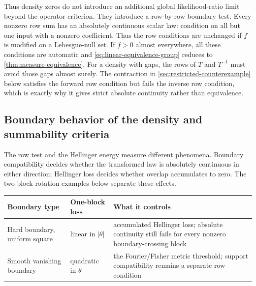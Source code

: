 Thus density zeros do not introduce an additional global likelihood-ratio
limit beyond the operator criterion.
They introduce a row-by-row boundary test.
Every nonzero row sum has an absolutely continuous scalar law: condition
on all but one input with a nonzero coefficient.  Thus the row conditions
are unchanged if $f$ is modified on a Lebesgue-null set.
If $f>0$ almost everywhere, all these conditions are automatic and
\eqref{eq:linear-equivalence-group} reduces to
\cref{thm:measure-equivalence}.
For a density with gaps, the rows of $T$ and $T^{-1}$ must avoid those
gaps almost surely.  The contraction in
\cref{sec:restricted-counterexample} below satisfies the forward row
condition but fails the inverse row condition, which is exactly why it gives
strict absolute continuity rather than equivalence.

\subsection{Boundary behavior of the density and summability criteria}
\label{sec:restricted-threshold}

The row test and the Hellinger energy measure different phenomena.
Boundary compatibility decides whether the transformed law is absolutely
continuous in either direction; Hellinger loss decides whether overlap
accumulates to zero.
The two block-rotation examples below separate these effects.

\begin{center}
\renewcommand{\arraystretch}{1.15}
\begin{tabular}{p{} p{} p{}}
\toprule
\textbf{Boundary type} & \textbf{One-block loss} & \textbf{What it controls}\\
\midrule
Hard boundary, uniform square & linear in \(|\theta|\) & accumulated
Hellinger loss; absolute continuity still fails for every nonzero
boundary-crossing block\\
Smooth vanishing boundary & quadratic in \(\theta\) & the Fourier/Fisher
metric threshold; support compatibility remains a separate row condition\\
\bottomrule
\end{tabular}
\end{center}

